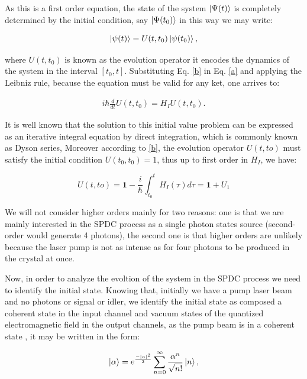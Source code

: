 \documentclass{book}
\begin{document}
As this is a first order equation, the state of the system $\ket{\Psi(t)}$ is completely determined by the initial condition, say $\ket{\Psi(t_{0})}$ in this way we may write:

\begin{equation}
    \ket{\psi(t)}=U(t,t_{0})\ket{\psi(t_{0})},
\label{b}
\end{equation}

where $U(t,t_{0})$ is known as the evolution operator it encodes the dynamics of the system in the interval $[t_{0},t]$. Substituting Eq. \ref{b} in Eq. \ref{a} and applying the Leibniz rule, because the equation must be valid for any ket, one arrives to:

\begin{align}
i \hbar \frac{d}{dt}U(t,t_{0})=H_{I}U(t,t_{0}).
\end{align}

It is well known that the solution to this initial value problem can be expressed  as an iterative integral equation by direct integration,  which is commonly known as Dyson series, Moreover according to \ref{b}, the evolution operator $U(t,to)$ must satisfy the initial condition $U(t_{0},t_{0})=1$, thus up to first order in $H_{I}$, we have:

\begin{equation}
U(t,to)=\mathbf{1}-\frac{i}{\hbar} \int_{t_{0}}^{t} H_{I} (\tau) d\tau=\mathbf{1}+U_{1}
\end{equation}

We will not consider higher orders mainly for two reasons: one is that we are mainly interested in the SPDC process as a single photon states source (second-order would generate 4 photons), the second one is that higher orders are unlikely because the laser pump is not as  intense as for four photons to be produced in the crystal at once.

Now, in order to analyze the evoltion of the system in the SPDC process we need to identify the initial state. Knowing that, initially we have a pump  laser beam  and no photons or signal or idler, we identify the initial state as composed a coherent state in the input channel and vacuum states of the quantized electromagnetic field in the output channels, as the pump beam is in a coherent state \cite{leonhardt}, it may be written in the form:

\begin{equation}
\ket{\alpha}=e^{\frac{-|\alpha|^{2}}{2}} \sum_{n=0}^{\infty} \frac{\alpha^{n}}{\sqrt{n!}} \ket{n},
\end{equation}
\end{document}
